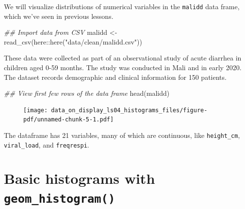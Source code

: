 \documentclass[
  letterpaper,
  DIV=11,
  numbers=noendperiod]{scrreprt}
\newenvironment{Shaded}{\begin{snugshade}}{\end{snugshade}}
\newcommand{\DocumentationTok}[1]{\textcolor[rgb]{0.37,0.37,0.37}{\textit{#1}}}
\newcommand{\FunctionTok}[1]{\textcolor[rgb]{0.28,0.35,0.67}{#1}}
\newcommand{\NormalTok}[1]{\textcolor[rgb]{0.00,0.23,0.31}{#1}}
\newcommand{\OtherTok}[1]{\textcolor[rgb]{0.00,0.23,0.31}{#1}}
\newcommand{\SpecialCharTok}[1]{\textcolor[rgb]{0.37,0.37,0.37}{#1}}
\newcommand{\StringTok}[1]{\textcolor[rgb]{0.13,0.47,0.30}{#1}}
\begin{document}
We will visualize distributions of numerical variables in the
\texttt{malidd} data frame, which we've seen in previous lessons.

\begin{Shaded}
\begin{Highlighting}[]
\DocumentationTok{\#\# Import data from CSV}
\NormalTok{malidd }\OtherTok{\textless{}{-}} \FunctionTok{read\_csv}\NormalTok{(here}\SpecialCharTok{::}\FunctionTok{here}\NormalTok{(}\StringTok{"data/clean/malidd.csv"}\NormalTok{))}
\end{Highlighting}
\end{Shaded}

\begin{tcolorbox}[enhanced jigsaw, colframe=quarto-callout-note-color-frame, colbacktitle=quarto-callout-note-color!10!white, titlerule=0mm, opacitybacktitle=0.6, breakable, toprule=.15mm, arc=.35mm, rightrule=.15mm, colback=white, bottomrule=.15mm, opacityback=0, toptitle=1mm, left=2mm, bottomtitle=1mm, title=\textcolor{quarto-callout-note-color}{\faInfo}\hspace{0.5em}{Recap}, leftrule=.75mm, coltitle=black]

These data were collected as part of an observational study of acute
diarrhea in children aged 0-59 months. The study was conducted in Mali
and in early 2020. The dataset records demographic and clinical
information for 150 patients.

\end{tcolorbox}

\begin{Shaded}
\begin{Highlighting}[]
\DocumentationTok{\#\# View first few rows of the data frame}
\FunctionTok{head}\NormalTok{(malidd)}
\end{Highlighting}
\end{Shaded}

\begin{figure}[H]

{\centering \texttt{[image: data\_on\_display\_ls04\_histograms\_files/figure-pdf/unnamed-chunk-5-1.pdf]}

}

\end{figure}

The dataframe has 21 variables, many of which are continuous, like
\texttt{height\_cm}, \texttt{viral\_load}, and \texttt{freqrespi}.

\hypertarget{basic-histograms-with-geom_histogram}{%
\section{\texorpdfstring{Basic histograms with
\texttt{geom\_histogram()}}{Basic histograms with geom\_histogram()}}\label{basic-histograms-with-geom_histogram}}
\end{document}
